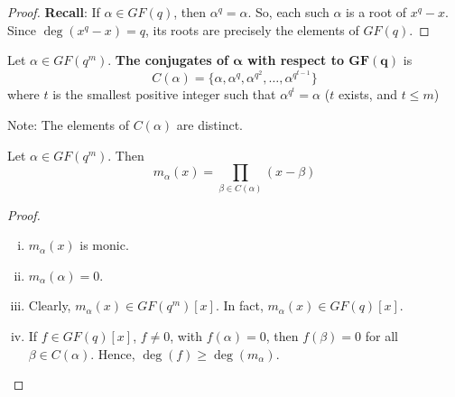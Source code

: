 \begin{proof}
    \textbf{Recall}: If $ \alpha\in GF(q) $, then $ \alpha^q=\alpha $.
    So, each such $ \alpha $ is a root of $ x^q-x $. Since $ \deg(x^q-x)=q $,
    its roots are precisely the elements of $ GF(q) $.
\end{proof}

\begin{defbox}
    \begin{definition}
        Let $ \alpha\in GF(q^m) $. \textbf{The conjugates of $ \bm{\alpha} $
            with respect to $ \bm{GF(q)} $} is
        \[ C(\alpha)=\{\alpha,\alpha^q,\alpha^{q^2},\ldots,\alpha^{q^{t-1}}\} \]
        where $ t $ is the smallest positive integer such that
        $ \alpha^{q^t}=\alpha $ ($ t $ exists, and $ t\leqslant m $)

        Note: The elements of $ C(\alpha) $ are distinct.
    \end{definition}
\end{defbox}

\begin{thmbox}
    \begin{theorem}
        Let $ \alpha\in GF(q^m) $. Then
        \[ m_\alpha(x)=\prod_{\beta\in C(\alpha)}(x-\beta) \]
    \end{theorem}
\end{thmbox}

\begin{proof}
    $ \; $

    \begin{enumerate}[(i)]
        \item $ m_\alpha(x) $ is monic.
        \item $ m_\alpha(\alpha)=0 $.
        \item Clearly, $ m_\alpha(x)\in GF(q^m)[x] $. In fact,
              $ m_\alpha(x)\in GF(q)[x] $.
        \item If $ f\in GF(q)[x] $, $ f\neq 0 $, with $ f(\alpha)=0 $,
              then $ f(\beta)=0 $ for all $ \beta\in C(\alpha) $. Hence,
              $ \deg(f)\geqslant \deg(m_\alpha) $.
    \end{enumerate}
\end{proof}

